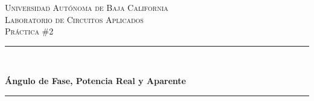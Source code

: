 \documentclass[12pt, letterpaper]{article}
\begin{document}

\begin{titlepage} %
	\vspace*{-3cm}
	\hspace*{-2.5cm}
	\newcommand{\HRule}{\rule{\linewidth}{0.5mm}} %
	\center %
	
	
	\textsc{\LARGE Universidad Autónoma de Baja California}\\[1.5cm] %
	
	\textsc{\Large Laboratorio de Circuitos Aplicados}\\[0.5cm] %
	
	\textsc{\large Práctica \#2}\\[0.5cm] %
	
	
	\HRule\\[0.4cm]
	
	{\huge\bfseries Ángulo de Fase, Potencia Real y Aparente\\[0.4cm] %
	
	\HRule\\[1.5cm]
	
	
}
\end{titlepage}
\end{document}
